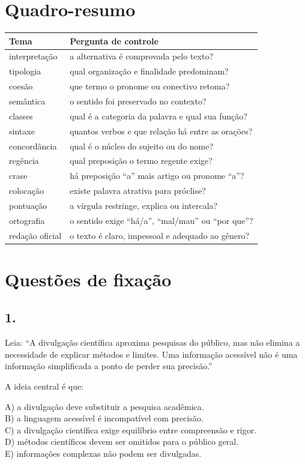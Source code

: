 \documentclass[11pt,a4paper]{article}
\begin{document}
\section*{Quadro-resumo}

\begin{tabularx}{\linewidth}{lX}
\toprule
 \textbf{Tema} & \textbf{Pergunta de controle} \\
\midrule
 interpretação & a alternativa é comprovada pelo texto? \\
 tipologia & qual organização e finalidade predominam? \\
 coesão & que termo o pronome ou conectivo retoma? \\
 semântica & o sentido foi preservado no contexto? \\
 classes & qual é a categoria da palavra e qual sua função? \\
 sintaxe & quantos verbos e que relação há entre as orações? \\
 concordância & qual é o núcleo do sujeito ou do nome? \\
 regência & qual preposição o termo regente exige? \\
 crase & há preposição “a” mais artigo ou pronome “a”? \\
 colocação & existe palavra atrativa para próclise? \\
 pontuação & a vírgula restringe, explica ou intercala? \\
 ortografia & o sentido exige “há/a”, “mal/mau” ou “por que”? \\
 redação oficial & o texto é claro, impessoal e adequado ao gênero? \\
\bottomrule
\end{tabularx}


\section*{Questões de fixação}

\subsection*{1.}

Leia: “A divulgação científica aproxima pesquisas do público, mas não elimina a necessidade de explicar métodos e limites. Uma informação acessível não é uma informação simplificada a ponto de perder sua precisão.”

A ideia central é que:

A) a divulgação deve substituir a pesquisa acadêmica. \\ B) a linguagem acessível é incompatível com precisão. \\ C) a divulgação científica exige equilíbrio entre compreensão e rigor. \\ D) métodos científicos devem ser omitidos para o público geral. \\ E) informações complexas não podem ser divulgadas.
\end{document}
